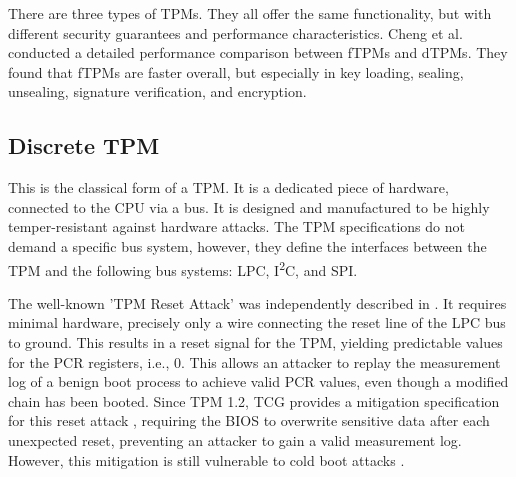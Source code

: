 There are three types of TPMs. They all offer the same functionality, but with different security guarantees and performance characteristics. Cheng et al. \cite{Cheng2020} conducted a detailed performance comparison between fTPMs and dTPMs. They found that fTPMs are faster overall, but especially in key loading, sealing, unsealing, signature verification, and encryption.

\subsection{Discrete TPM}

This is the classical form of a TPM. It is a dedicated piece of hardware, connected to the CPU via a bus. It is designed and manufactured to be highly temper-resistant against hardware attacks.
The TPM specifications \cite{tpm, tcgPcClient} do not demand a specific bus system, however, they define the interfaces between the TPM and the following bus systems: LPC, I\textsuperscript{2}C, and SPI.

The well-known 'TPM Reset Attack' was independently described in \cite{kauerBernhard,sparks2007}. It requires minimal hardware, precisely only a wire connecting the reset line of the LPC bus \cite{lpc} to ground. This results in a reset signal for the TPM, yielding predictable values for the \ac{PCR} registers, i.e., 0. This allows an attacker to replay the measurement log of a benign boot process to achieve valid \ac{PCR} values, even though a modified chain has been booted.
Since TPM 1.2, TCG provides a mitigation specification for this reset attack \cite{tcgResetFix}, requiring the BIOS to overwrite sensitive data after each unexpected reset, preventing an attacker to gain a valid measurement log.
However, this mitigation is still vulnerable to cold boot attacks \cite{Halderman2009, Winter2013}.

